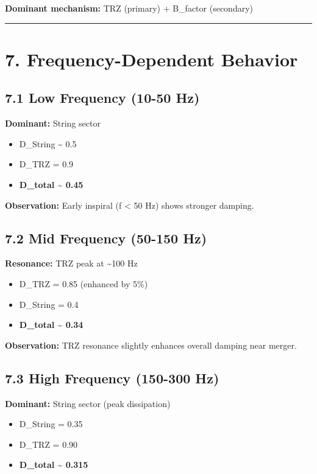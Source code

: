 \documentclass[11pt]{article}
\begin{document}
\textbf{Dominant mechanism:} TRZ (primary) + B\_factor (secondary)

\noindent\rule{\textwidth}{0.4pt}

\section*{7. Frequency-Dependent Behavior}

\subsection*{7.1 Low Frequency (10-50 Hz)}

\textbf{Dominant:} String sector

\begin{itemize}
  \item D\_String \textasciitilde{} 0.5
  \item D\_TRZ = 0.9
  \item \textbf{D\_total \textasciitilde{} 0.45}
\end{itemize}

\textbf{Observation:} Early inspiral (f < 50 Hz) shows stronger damping.

\subsection*{7.2 Mid Frequency (50-150 Hz)}

\textbf{Resonance:} TRZ peak at \textasciitilde{}100 Hz

\begin{itemize}
  \item D\_TRZ = 0.85 (enhanced by 5\%)
  \item D\_String = 0.4
  \item \textbf{D\_total \textasciitilde{} 0.34}
\end{itemize}

\textbf{Observation:} TRZ resonance slightly enhances overall damping near merger.

\subsection*{7.3 High Frequency (150-300 Hz)}

\textbf{Dominant:} String sector (peak dissipation)

\begin{itemize}
  \item D\_String = 0.35
  \item D\_TRZ = 0.90
  \item \textbf{D\_total \textasciitilde{} 0.315}
\end{itemize}
\end{document}
